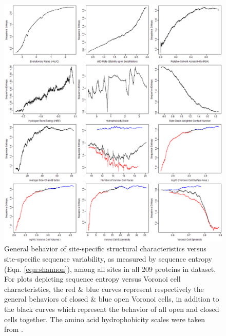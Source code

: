 \documentclass[11pt]{article}
\begin{document}
    \begin{figure}[tbh]
        \begin{center}
        \includegraphics[width=6.9in]{adjacent_averaging_screen/voro_log/seqent.png}
        \end{center}
        \caption{General behavior of site-specific structural characteristics versus site-specific sequence variability, as measured by sequence entropy (Eqn. \ref{eqn:shannon}), among all sites in all 209 proteins in dataset. For plots depicting sequence entropy versus Voronoi cell characteristics, the red \& blue curves represent respectively the general behaviors of closed \& blue open Voronoi cells, in addition to the black curves which represent the behavior of all open and closed cells together. The amino acid hydrophobicity scales were taken from \citet{hessa_recognition_2005}.}
        \label{fig:adjavg_SE}
    \end{figure}
    
\end{document}

